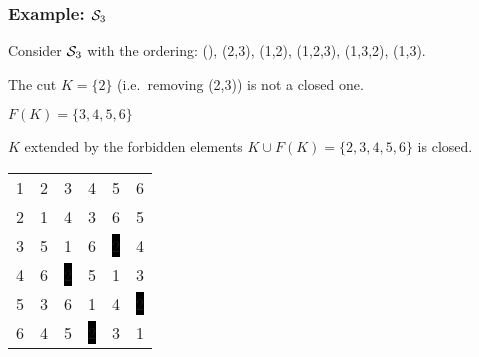 \documentclass{beamer}
\newcommand{\cS}{{\cal S}}
\begin{document}
\begin{frame}\frametitle{Example: $\cS_3$}
Consider $\cS_3$ with the ordering:  (), (2,3), (1,2), (1,2,3), (1,3,2), (1,3).

The cut $K=\{2\}$ (i.e.\ removing (2,3)) is not a closed one. 

$F(K)=\{3,4,5,6\}$

$K$ extended by the forbidden elements  $K\cup F(K)=\{2,3,4,5,6\}$ is closed.

\begin{center}
\setlength{\fboxsep}{1pt}
\begin{tabular}{cccccc}
1&\color{lgr}2&3&4&5&6\\
\color{lgr}2&\color{lgr}1&\color{lgr}4&\color{lgr}3&\color{lgr}6&\color{lgr}5\\
3&\color{lgr}5&1&6&\color{white}\colorbox{black}{2}&4\\
4&\color{lgr}6&\color{white}\colorbox{black}{2}&5&1&3\\
5&\color{lgr}3&6&1&4&\color{white}\colorbox{black}{2}\\
6&\color{lgr}4&5&\color{white}\colorbox{black}{2}&3&1\\
\end{tabular}
\end{center}
\end{frame}
\end{document}
